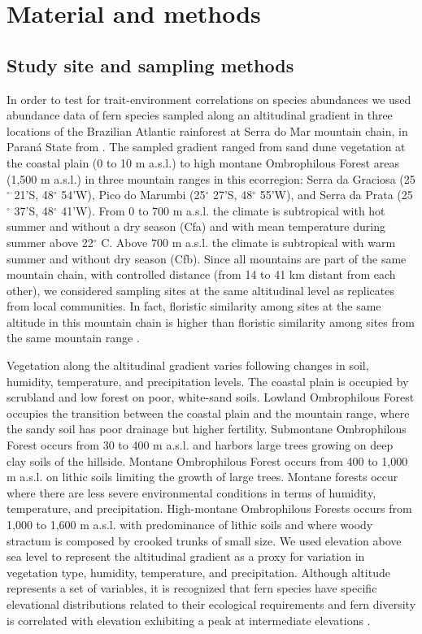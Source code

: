 \documentclass[12pt]{article}
\begin{document}
\section*{Material and methods}

\subsection*{Study site and sampling methods}
In order to test for trait-environment correlations on species
abundances we used abundance data of fern species sampled along an
altitudinal gradient in three locations of the Brazilian Atlantic
rainforest at Serra do Mar mountain chain, in Paran\'a State from
\cite{Paciencia2008}.  The sampled gradient ranged from sand dune
vegetation at the coastal plain (0 to 10 m a.s.l.) to high montane
Ombrophilous Forest areas (1,500 m a.s.l.) in three mountain ranges in
this ecorregion: Serra da Graciosa (25{$^{\circ}$} 21'S,
48{$^{\circ}$} 54'W), Pico do Marumbi (25{$^{\circ}$} 27'S,
48{$^{\circ}$} 55'W), and Serra da Prata (25{$^{\circ}$} 37'S,
48{$^{\circ}$} 41'W). From 0 to 700 m a.s.l. the climate is
subtropical with hot summer and without a dry season (Cfa) and with
mean temperature during summer above 22{$^{\circ}$} C. Above 700 m
a.s.l. the climate is subtropical with warm summer and without dry
season (Cfb). Since all mountains are part of the same mountain chain,
with controlled distance (from 14 to 41 km distant from each other),
we considered sampling sites at the same altitudinal level as
replicates from local communities.  In fact, floristic similarity
among sites at the same altitude in this mountain chain is higher than
floristic similarity among sites from the same mountain range
\citep{Paciencia2008}.
 
Vegetation along the altitudinal gradient varies following changes in
soil, humidity, temperature, and precipitation levels.  The coastal
plain is occupied by scrubland and low forest on poor, white-sand
soils.  Lowland Ombrophilous Forest occupies the transition between
the coastal plain and the mountain range, where the sandy soil has
poor drainage but higher fertility.  Submontane Ombrophilous Forest
occurs from 30 to 400 m a.s.l. and harbors large trees growing on deep
clay soils of the hillside. Montane Ombrophilous Forest occurs from
400 to 1,000 m a.s.l. on lithic soils limiting the growth of large
trees. Montane forests occur where there are less severe environmental
conditions in terms of humidity, temperature, and
precipitation. High-montane Ombrophilous Forests occurs from 1,000 to
1,600 m a.s.l. with predominance of lithic soils and where woody
stractum is composed by crooked trunks of small size.  We used
elevation above sea level to represent the altitudinal gradient as a
proxy for variation in vegetation type, humidity, temperature, and
precipitation.  Although altitude represents a set of variables, it is
recognized that fern species have specific elevational distributions
related to their ecological requirements \citep{Mehltreter2010} and
fern diversity is correlated with elevation exhibiting a peak at
intermediate elevations
\citep{Kessler2001,Cardelus2006,WatkinsJr2006}.
\end{document}
